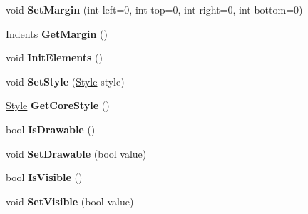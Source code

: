 \begin{DoxyCompactItemize}
void {\bfseries Set\+Margin} (int left=0, int top=0, int right=0, int bottom=0)
\item 
\mbox{\label{interface_space_v_i_l_1_1_core_1_1_i_base_item_abde9c5bc900bbdf10f6a388db7e49538}} 
\mbox{\hyperlink{struct_space_v_i_l_1_1_decorations_1_1_indents}{Indents}} {\bfseries Get\+Margin} ()
\item 
\mbox{\label{interface_space_v_i_l_1_1_core_1_1_i_base_item_a6befa091a8c281ecb0a9f4a828811dd5}} 
void {\bfseries Init\+Elements} ()
\item 
\mbox{\label{interface_space_v_i_l_1_1_core_1_1_i_base_item_a677464b9dad4f9d67fb642d0196006fe}} 
void {\bfseries Set\+Style} (\mbox{\hyperlink{class_space_v_i_l_1_1_decorations_1_1_style}{Style}} style)
\item 
\mbox{\label{interface_space_v_i_l_1_1_core_1_1_i_base_item_ab25ce1ffaaa88dc31cf091c53e75f251}} 
\mbox{\hyperlink{class_space_v_i_l_1_1_decorations_1_1_style}{Style}} {\bfseries Get\+Core\+Style} ()
\item 
\mbox{\label{interface_space_v_i_l_1_1_core_1_1_i_base_item_ae0bd3a5916b47ae2813f9c857eae9af1}} 
bool {\bfseries Is\+Drawable} ()
\item 
\mbox{\label{interface_space_v_i_l_1_1_core_1_1_i_base_item_a6196b093e257a190fbf9a798887d776b}} 
void {\bfseries Set\+Drawable} (bool value)
\item 
\mbox{\label{interface_space_v_i_l_1_1_core_1_1_i_base_item_af879e50ebf2e7a213c31024616b7bff8}} 
bool {\bfseries Is\+Visible} ()
\item 
\mbox{\label{interface_space_v_i_l_1_1_core_1_1_i_base_item_a62e7a7edef2b465046083b57dcf1210c}} 
void {\bfseries Set\+Visible} (bool value)
\item 
\mbox{\label{interface_space_v_i_l_1_1_core_1_1_i_base_item_aa639cd1bb96b4146c1f92ed5c25aa5c5}} 

\end{DoxyCompactItemize}
